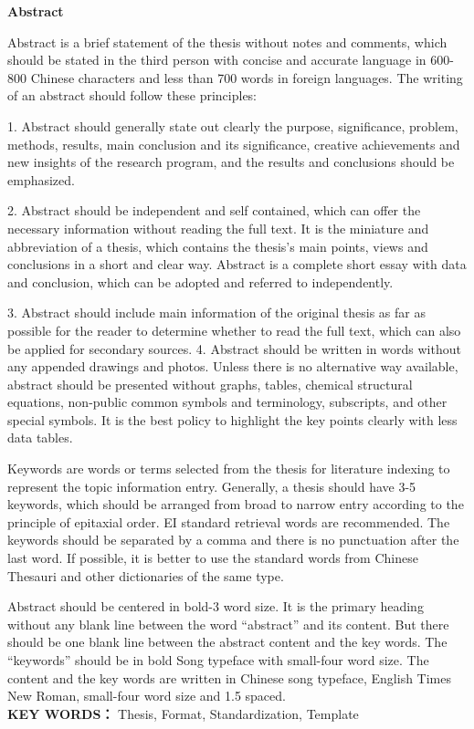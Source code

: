 


\begin{center}\heiti\sanhao\textbf{
        Abstract
    }
\end{center}

Abstract is a brief statement of the thesis without notes and comments, which should be stated in the third person with concise and accurate language in 600-800 Chinese characters and less than 700 words in foreign languages. The writing of an abstract should follow these principles:

1. Abstract should generally state out clearly the purpose, significance, problem, methods, results, main conclusion and its significance, creative achievements and new insights of the research program, and the results and conclusions should be emphasized. 

2. Abstract should be independent and self contained, which can offer the necessary information without reading the full text. It is the miniature and abbreviation of a thesis, which contains the thesis’s main points, views and conclusions in a short and clear way. Abstract is a complete short essay with data and conclusion, which can be adopted and referred to independently. 

3. Abstract should include main information of the original thesis as far as possible for the reader to determine whether to read the full text, which can also be applied for secondary sources. 
4. Abstract should be written in words without any appended drawings and photos. Unless there is no alternative way available, abstract should be presented without graphs, tables, chemical structural equations, non-public common symbols and terminology, subscripts, and other special symbols. It is the best policy to highlight the key points clearly with less data tables.

Keywords are words or terms selected from the thesis for literature indexing to represent the topic information entry. Generally, a thesis should have 3-5 keywords, which should be arranged from broad to narrow entry according to the principle of epitaxial order. EI standard retrieval words are recommended. The keywords should be separated by a comma and there is no punctuation after the last word. If possible, it is better to use the standard words from Chinese Thesauri and other dictionaries of the same type. 

Abstract should be centered in bold-3 word size. It is the primary heading without any blank line between the word “abstract” and its content. But there should be one blank line between the abstract content and the key words. The “keywords” should be in bold Song typeface with small-four word size. The content and the key words are written in Chinese song typeface, English Times New Roman, small-four word size and 1.5 spaced.\\

\textbf{KEY WORDS：} Thesis, Format, Standardization, Template

\newpage\quad %
\clearpage